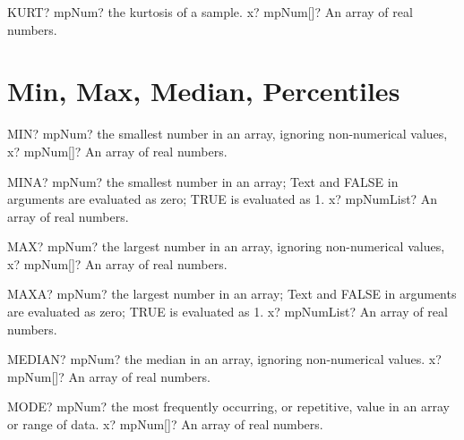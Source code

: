 \documentclass[12pt,a4paper,openany]{book}
\begin{document}
\begin{mpFunctionsExtract}
\mpWorksheetFunctionOneNotImplemented
{KURT? mpNum? the kurtosis of a sample.}
{x? mpNum[]? An array of real numbers.}
\end{mpFunctionsExtract}

\section{Min, Max, Median, Percentiles}

\begin{mpFunctionsExtract}
\mpWorksheetFunctionOneNotImplemented
{MIN? mpNum? the smallest number in an array, ignoring non-numerical values,}
{x? mpNum[]? An array of real numbers.}
\end{mpFunctionsExtract}

\begin{mpFunctionsExtract}
\mpWorksheetFunctionOneNotImplemented
{MINA? mpNum? the smallest number in an array; Text and FALSE in arguments are evaluated as zero; TRUE is evaluated as 1.}
{x? mpNumList? An array of real numbers.}
\end{mpFunctionsExtract}

\begin{mpFunctionsExtract}
\mpWorksheetFunctionOneNotImplemented
{MAX? mpNum? the largest number in an array, ignoring non-numerical values,}
{x? mpNum[]? An array of real numbers.}
\end{mpFunctionsExtract}

\begin{mpFunctionsExtract}
\mpWorksheetFunctionOneNotImplemented
{MAXA? mpNum? the largest number in an array; Text and FALSE in arguments are evaluated as zero; TRUE is evaluated as 1.}
{x? mpNumList? An array of real numbers.}
\end{mpFunctionsExtract}

\begin{mpFunctionsExtract}
\mpWorksheetFunctionOneNotImplemented
{MEDIAN? mpNum? the median in an array, ignoring non-numerical values.}
{x? mpNum[]? An array of real numbers.}
\end{mpFunctionsExtract}

\begin{mpFunctionsExtract}
\mpWorksheetFunctionOneNotImplemented
{MODE? mpNum? the most frequently occurring, or repetitive, value in an array or range of data.}
{x? mpNum[]? An array of real numbers.}
\end{mpFunctionsExtract}
\end{document}
